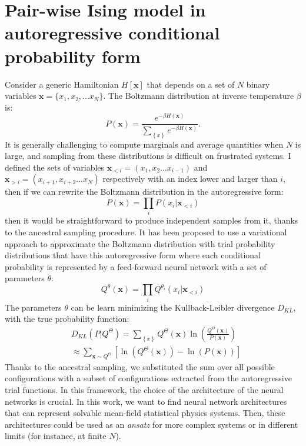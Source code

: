 \documentclass[aps,physrev,10pt,floatfix,longbibliography,nofootinbib,reprint]{revtex4-2}
\begin{document}
\section{Pair-wise Ising model in autoregressive conditional probability form}
Consider a generic Hamiltonian $H[\mathbf{x}]$ that depends on a set of $N$ binary variables $\mathbf{x}=\{x_1, x_2,...x_N\}$. The Boltzmann distribution at inverse temperature $\beta$ is:
\begin{equation}
P\left(\mathbf{x}\right)=\frac{e^{-\beta H\left(\mathbf{x}\right)}}{\sum_{\left\{ x\right\} }e^{-\beta H\left(\mathbf{x}\right)}}.
\end{equation}
It is generally challenging to compute marginals and average quantities when $N$ is large, and sampling from these distributions is difficult on frustrated systems. I defined the sets of variables $\mathbf{x}_{<i}=\left(x_{1},x_{2}\dots x_{i-1}\right)$ and $\mathbf{x}_{>i}=\left(x_{i+1},x_{i+2}\dots x_{N}\right)$ respectively with an index lower and larger than $i$, then if we can rewrite the Boltzmann distribution in the autoregressive form:
\begin{equation}
P\left(\mathbf{x}\right)=\prod_{i}P\left(x_{i}|\mathbf{x}_{<i}\right)
\end{equation}
then it would be straightforward to produce independent samples from it, thanks to the ancestral sampling procedure. It has been proposed to use a variational approach to approximate the Boltzmann distribution with trial probability distributions that have this autoregressive form where each conditional probability is represented by a feed-forward neural network with a set of parameters ${\theta}$:
\begin{equation}
Q^{\theta}\left(\mathbf{x}\right)=\prod_{i}Q^{\theta_i}\left(x_{i}|\mathbf{x}_{<i}\right)
\end{equation}
The parameters ${\theta}$ can be learn minimizing the Kullback-Leibler divergence $D_{KL}$,
with the true probability function:
\begin{equation}
\begin{split}
& D_{KL}\left(P|Q^{\Theta}\right) =  \sum_{\left\{ x\right\} }Q^{\Theta}\left(\mathbf{x} \right)\ln\left(\frac{Q^{\Theta}\left(\mathbf{x} \right)}{P\left(\mathbf{x} \right)}\right)  \\
& \approx \sum_{\mathbf{x}\sim Q^{\Theta}}\left[\ln\left(Q^{\Theta}\left(\mathbf{x} \right)\right)-\ln\left(P\left(\mathbf{x} \right)\right)\right]
\end{split}    
\end{equation}
Thanks to the ancestral sampling, we substituted the sum over all possible configurations with a subset of configurations extracted from the autoregressive trial functions.
In this framework, the choice of the architecture of the neural networks is crucial.
In this work, we want to find neural network architectures that can represent solvable mean-field statistical physics systems. 
Then, these architectures could be used as an {\it ansatz} for more complex systems or in different limits (for instance, at finite $N$).
\end{document}

